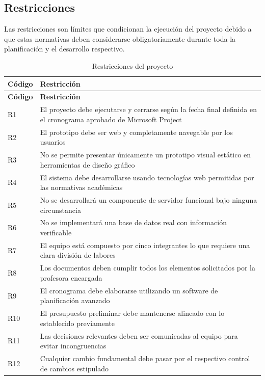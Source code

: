 \documentclass[11pt,spanish]{article}
\begin{document}
\subsection{Restricciones}

Las restricciones son límites que condicionan la ejecución del proyecto debido a que estas normativas deben considerarse obligatoriamente durante toda la planificación y el desarrollo respectivo.

\begin{longtable}{L{2cm} L{12.4cm}}
\caption{Restricciones del proyecto}\label{tab:restricciones}\\[-0.5em]
\toprule
\textbf{Código} & \textbf{Restricción} \\
\midrule
\endfirsthead
\toprule
\textbf{Código} & \textbf{Restricción} \\
\midrule
\endhead
R1 & El proyecto debe ejecutarse y cerrarse según la fecha final definida en el cronograma aprobado de Microsoft Project \\
R2 & El prototipo debe ser web y completamente navegable por los usuarios \\
R3 & No se permite presentar únicamente un prototipo visual estático en herramientas de diseño gráfico \\
R4 & El sistema debe desarrollarse usando tecnologías web permitidas por las normativas académicas \\
R5 & No se desarrollará un componente de servidor funcional bajo ninguna circunstancia \\
R6 & No se implementará una base de datos real con información verificable \\
R7 & El equipo está compuesto por cinco integrantes lo que requiere una clara división de labores \\
R8 & Los documentos deben cumplir todos los elementos solicitados por la profesora encargada \\
R9 & El cronograma debe elaborarse utilizando un software de planificación avanzado \\
R10 & El presupuesto preliminar debe mantenerse alineado con lo establecido previamente \\
R11 & Las decisiones relevantes deben ser comunicadas al equipo para evitar incongruencias \\
R12 & Cualquier cambio fundamental debe pasar por el respectivo control de cambios estipulado \\
\bottomrule
\end{longtable}
\end{document}
